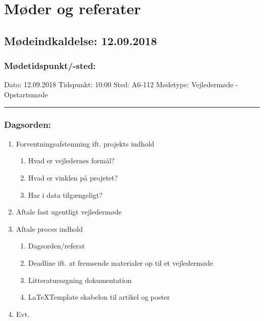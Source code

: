 \chapter{Møder og referater}
\section*{Mødeindkaldelse: 12.09.2018}

\subsection*{Mødetidspunkt/-sted:}

Dato: \tabto{7em} 12.09.2018
\newline
Tidspunkt: \tabto{7em} 10:00
\newline
Sted: \tabto{7em} A6-112
\newline
Mødetype: \tabto{7em} Vejledermøde - Opstartsmøde
\vspace{0.5cm}
\hrule
\subsection*{Dagsorden:}
\begin{enumerate}
    \item Forventningsafstemning ift. projekts indhold
    \begin{enumerate}
        \item Hvad er vejledernes formål?
        \item Hvad er vinklen på projetet?
        \item Har i data tilgængeligt?
    \end{enumerate}
    \item Aftale fast ugentligt vejledermøde
    \item Aftale proces indhold
    \begin{enumerate}
        \item Dagsorden/referat
        \item Deadline ift. at fremsende materialer op til et vejledermøde
        \item Litteratursøgning dokumentation
        \item \LaTeX Template skabelon til artikel og poster
    \end{enumerate}
    \item Evt.
\end{enumerate}

